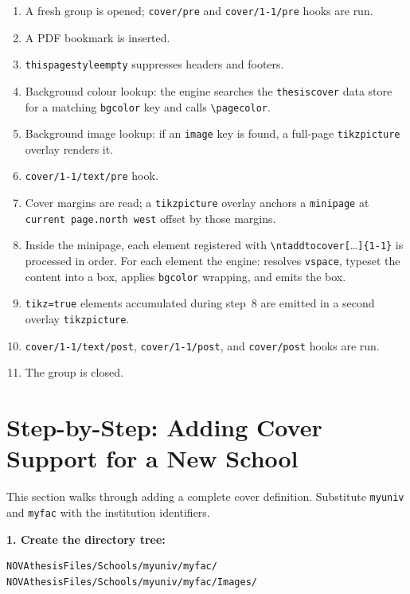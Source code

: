 \begin{enumerate}
  \item A fresh group is opened; \texttt{cover/pre} and
        \texttt{cover/1-1/pre} hooks are run.
  \item A PDF bookmark is inserted.
  \item \texttt{thispagestyle{empty}} suppresses headers and footers.
  \item Background colour lookup: the engine searches the
        \texttt{thesiscover} data store for a matching \texttt{bgcolor} key
        and calls \verb!\pagecolor!.
  \item Background image lookup: if an \texttt{image} key is found, a
        full-page \verb!tikzpicture! overlay renders it.
  \item \texttt{cover/1-1/text/pre} hook.
  \item Cover margins are read; a \verb!tikzpicture! overlay anchors a
        \verb!minipage! at \verb!current page.north west! offset by those
        margins.
  \item Inside the minipage, each element registered with
        \verb!\ntaddtocover[!…\texttt{]}\verb!{1-1}! is processed in order.
        For each element the engine: resolves \texttt{vspace}, typeset the
        content into a box, applies \texttt{bgcolor} wrapping, and emits the
        box.
  \item \texttt{tikz=true} elements accumulated during step~8 are emitted in
        a second overlay \verb!tikzpicture!.
  \item \texttt{cover/1-1/text/post}, \texttt{cover/1-1/post}, and
        \texttt{cover/post} hooks are run.
  \item The group is closed.
\end{enumerate}


\section{Step-by-Step: Adding Cover Support for a New School}
\label{sec:covers_new_school}

This section walks through adding a complete cover definition.  Substitute
\texttt{myuniv} and \texttt{myfac} with the institution identifiers.

\medskip
\noindent\textbf{1.  Create the directory tree:}
\begin{verbatim}
NOVAthesisFiles/Schools/myuniv/myfac/
NOVAthesisFiles/Schools/myuniv/myfac/Images/
\end{verbatim}

